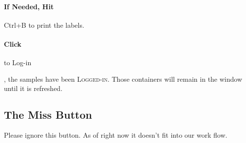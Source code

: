 
\paragraph{If Needed, Hit} {\faKeyboardO } Ctrl+B to print the labels.
\paragraph{Click}  to Log-in\\


, the samples have been \textsc{Logged-in}.  Those containers will remain in the window until it is refreshed.

\subsection{The Miss Button}

Please ignore this button. As of right now it doesn't fit into our work flow.